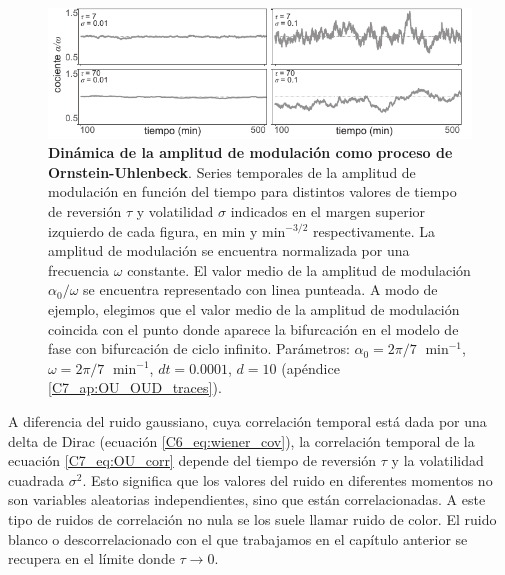 \documentclass[./main.tex]{subfiles}
\begin{document}
\begin{figure}
    \centering
    \includegraphics[width=1\columnwidth]{figures/chapter7/C7_OU_alpha.pdf} 
    \caption{\textbf{Dinámica de la amplitud de modulación como proceso de Ornstein-Uhlenbeck}. Series temporales de la amplitud de modulación en función del tiempo para distintos valores de tiempo de reversión $\tau$ y volatilidad $\sigma$ indicados en el margen superior izquierdo de cada figura, en min y $\text{min}^{-3/2}$ respectivamente. La amplitud de modulación se encuentra normalizada por una frecuencia $\omega$ constante. El valor medio de la amplitud de modulación $\alpha_0/\omega$ se encuentra representado con linea punteada. A modo de ejemplo, elegimos que el valor medio de la amplitud de modulación coincida con el punto donde aparece la bifurcación en el modelo de fase con bifurcación de ciclo infinito. Parámetros: $\alpha_0 = 2\pi/7 \;\text{ min}^{-1}$, $\omega = 2\pi/7 \;\text{ min}^{-1}$, $dt = 0.0001$, $d=10$ (apéndice \ref{C7_ap:OU_OUD_traces}).}
    \label{C7_fig:OU_alpha}
\end{figure} 

A diferencia del ruido gaussiano, cuya correlación temporal está dada por una delta de Dirac (ecuación \ref{C6_eq:wiener_cov}), la correlación temporal de la ecuación \ref{C7_eq:OU_corr} depende del tiempo de reversión $\tau$ y la volatilidad cuadrada $\sigma^2$. Esto significa que los valores del ruido en diferentes momentos no son variables aleatorias independientes, sino que están correlacionadas. A este tipo de ruidos de correlación no nula se los suele llamar ruido de color. El ruido blanco o descorrelacionado con el que trabajamos en el capítulo anterior se recupera en el límite donde $\tau \rightarrow 0$. 


\end{document}
